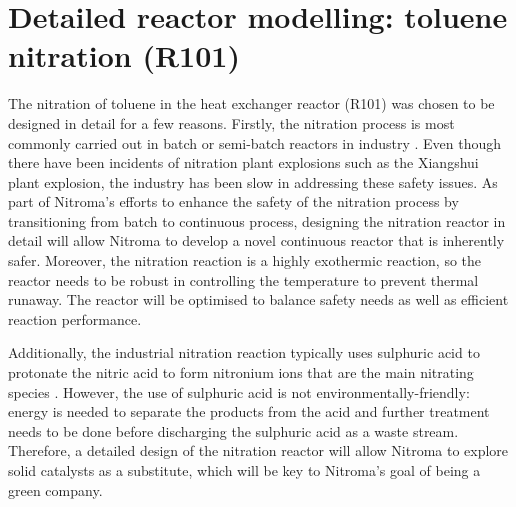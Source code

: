 \section{Detailed reactor modelling: toluene nitration (R101)} \label{sec:detailedreactor}

The nitration of toluene in the heat exchanger reactor (R101) was chosen to be designed in detail for a few reasons. Firstly, the nitration process is most commonly carried out in batch or semi-batch reactors in industry \cite{dugal_nitrobenzene_2005}. Even though there have been incidents of nitration plant explosions such as the Xiangshui plant explosion, the industry has been slow in addressing these safety issues. As part of Nitroma's efforts to enhance the safety of the nitration process by transitioning from batch to continuous process, designing the nitration reactor in detail will allow Nitroma to develop a novel continuous reactor that is inherently safer. Moreover, the nitration reaction is a highly exothermic reaction, so the reactor needs to be robust in controlling the temperature to prevent thermal runaway. The reactor will be optimised to balance safety needs as well as efficient reaction performance. 

Additionally, the industrial nitration reaction typically uses sulphuric acid to protonate the nitric acid to form nitronium ions that are the main nitrating species \cite{sreedhar_scientific_2013}. However, the use of sulphuric acid is not environmentally-friendly: energy is needed to separate the products from the acid and further treatment needs to be done before discharging the sulphuric acid as a waste stream. Therefore, a detailed design of the nitration reactor will allow Nitroma to explore solid catalysts as a substitute, which will be key to Nitroma's goal of being a green company.  

